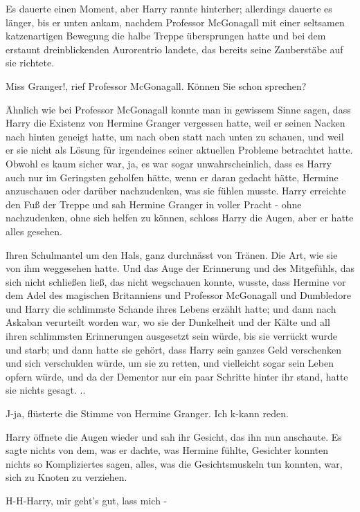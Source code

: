 Es dauerte einen Moment, aber Harry rannte hinterher; allerdings dauerte es
länger, bis er unten ankam, nachdem Professor McGonagall mit einer seltsamen
katzenartigen Bewegung die halbe Treppe übersprungen hatte und bei dem erstaunt
dreinblickenden Aurorentrio landete, das bereits seine Zauberstäbe auf sie
richtete.

\glqq{}Miss Granger!\grqq{}, rief Professor McGonagall. \glqq{}Können Sie schon
sprechen?\grqq{}

Ähnlich wie bei Professor McGonagall konnte man in gewissem Sinne sagen, dass
Harry die Existenz von Hermine Granger vergessen hatte, weil er seinen Nacken
nach hinten geneigt hatte, um nach oben statt nach unten zu schauen, und weil er
sie nicht als Lösung für irgendeines seiner aktuellen Probleme betrachtet hatte.
Obwohl es kaum sicher war, ja, es war sogar unwahrscheinlich, dass es Harry auch
nur im Geringsten geholfen hätte, wenn er daran gedacht hätte, Hermine
anzuschauen oder darüber nachzudenken, was sie fühlen musste. Harry erreichte
den Fuß der Treppe und sah Hermine Granger in voller Pracht - ohne nachzudenken,
ohne sich helfen zu können, schloss Harry die Augen, aber er hatte alles
gesehen.

Ihren Schulmantel um den Hals, ganz durchnässt von Tränen. Die Art, wie sie von
ihm weggesehen hatte. Und das Auge der Erinnerung und des Mitgefühls, das sich
nicht schließen ließ, das nicht wegschauen konnte, wusste, dass Hermine vor dem
Adel des magischen Britanniens und Professor McGonagall und Dumbledore und Harry
die schlimmste Schande ihres Lebens erzählt hatte; und dann nach Askaban
verurteilt worden war, wo sie der Dunkelheit und der Kälte und all ihren
schlimmsten Erinnerungen ausgesetzt sein würde, bis sie verrückt wurde und
starb; und dann hatte sie gehört, dass Harry sein ganzes Geld verschenken und
sich verschulden würde, um sie zu retten, und vielleicht sogar sein Leben opfern
würde, und da der Dementor nur ein paar Schritte hinter ihr stand, hatte sie
nichts gesagt. ..

\glqq{}J-ja\grqq{}, flüsterte die Stimme von Hermine Granger. \glqq{}Ich k-kann
reden.\grqq{}

Harry öffnete die Augen wieder und sah ihr Gesicht, das ihn nun anschaute. Es
sagte nichts von dem, was er dachte, was Hermine fühlte, Gesichter konnten
nichts so Kompliziertes sagen, alles, was die Gesichtsmuskeln tun konnten, war,
sich zu Knoten zu verziehen.

\glqq{}H-H-Harry, mir geht's gut, lass mich -\grqq{}

